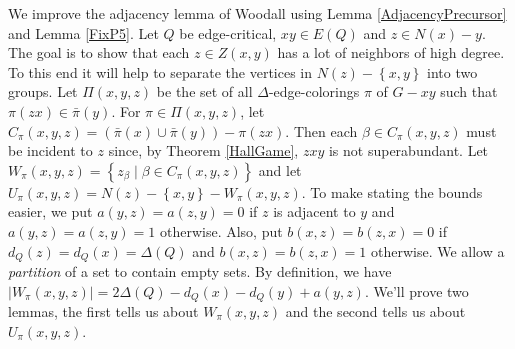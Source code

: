 \documentclass[12pt,reqno]{amsart}
\theoremstyle{plain}
\theoremstyle{definition}
\theoremstyle{remark}
\newcommand{\set}[1]{\left\{ #1 \right\}}
\newcommand{\setbs}[2]{\left\{ #1 \mid #2 \right\}}
\newcommand{\card}[1]{\left|#1\right|}
\newcommand{\parens}[1]{\left( #1 \right)}
\begin{document}
We improve the adjacency lemma of Woodall \cite{woodall2007average} using Lemma \ref{AdjacencyPrecursor} and Lemma \ref{FixP5}. Let $Q$ be edge-critical, $xy \in E(Q)$ and $z \in N(x) - y$.  The goal is to show
that each $z \in Z(x,y)$ has a lot of neighbors of high degree.  To this end it will help to separate the vertices in $N(z) - \set{x, y}$ into two groups.  Let $\Pi(x,y,z)$ be the set of all $\Delta$-edge-colorings $\pi$ of $G-xy$ such that $\pi(zx) \in \bar{\pi}(y)$.  For $\pi \in \Pi(x,y,z)$, let $C_\pi(x, y, z) = \parens{\bar{\pi}(x) \cup \bar{\pi}(y)} - \pi(zx)$.  Then each $\beta \in C_\pi(x,y,z)$ must be incident to $z$ since, by Theorem \ref{HallGame}, $zxy$ is not superabundant.  Let $W_\pi(x, y, z) = \setbs{z_\beta}{\beta \in C_\pi(x,y,z)}$ and let $U_\pi(x,y,z) = N(z) - \set{x,y} - W_\pi(x, y, z)$.  To make stating the bounds easier, we put $a(y, z) = a(z, y) = 0$ if $z$ is adjacent to $y$ and $a(y, z) = a(z, y) = 1$ otherwise.  Also, put $b(x, z) = b(z, x) = 0$ if $d_Q(z) = d_Q(x) = \Delta(Q)$ and $b(x, z) = b(z, x) = 1$ otherwise.  We allow a \emph{partition} of a set to contain empty sets. By definition, we have $\card{W_\pi(x, y, z)} = 2\Delta(Q) - d_Q(x) - d_Q(y) + a(y, z)$. We'll prove two lemmas, the first tells us about $W_\pi(x, y, z)$ and the second tells us about $U_\pi(x,y,z)$.
\end{document}
